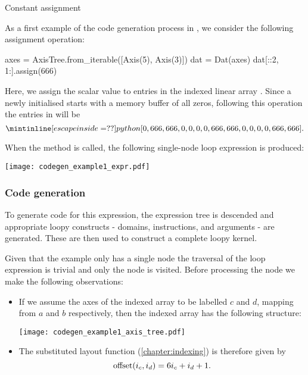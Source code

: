 \documentclass[thesis]{subfiles}
\begin{document}
\begin{example}{Constant assignment}
\label{example:assign_codegen}

As a first example of the code generation process in , we consider the following assignment operation:
\begin{pyinline}
  axes = AxisTree.from_iterable([Axis(5), Axis(3)])
  dat = Dat(axes)
  dat[::2, 1:].assign(666)
\end{pyinline}
\noindent
Here, we assign the scalar value  to entries in the indexed linear array .
Since a newly initialised  starts with a memory buffer of all zeros, following this operation the entries in  will be
\begin{equation*}
  \pycode{[0, 666, 666, 0, 0, 0, 0, 666, 666, 0, 0, 0, 0, 666, 666]}.
\end{equation*}

When the  method is called, the following single-node loop expression is produced:

\begin{center}
  \texttt{[image: codegen\_example1\_expr.pdf]}
\end{center}

\subsubsection{Code generation}

To generate code for this expression, the expression tree is descended and appropriate loopy constructs - domains, instructions, and arguments - are generated.
These are then used to construct a complete loopy kernel.

Given that the example only has a single node the traversal of the loop expression is trivial and only the  node is visited.
Before processing the  node we make the following observations:
\begin{itemize}
  \item
    If we assume the axes of the indexed array to be labelled $c$ and $d$, mapping from $a$ and $b$ respectively, then the indexed array has the following structure:
    \begin{center}
      \texttt{[image: codegen\_example1\_axis\_tree.pdf]}
    \end{center}

  \item
    The substituted layout function (\cref{chapter:indexing}) is therefore given by
    \begin{equation*}
      \textnormal{offset}(i_c, i_d) = 6 i_c + i_d + 1.
    \end{equation*}
\end{itemize}


\end{example}
\end{document}
